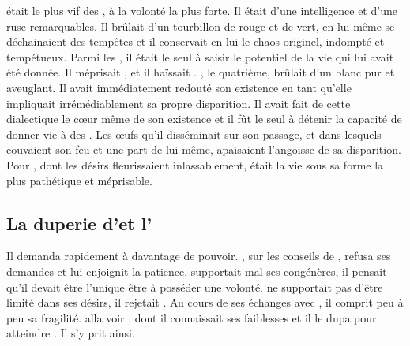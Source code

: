 \Ogo était le plus vif des \Dormus, à la volonté la plus forte. Il était d'une intelligence et d'une ruse remarquables. Il brûlait d'un tourbillon de rouge et de vert, en lui-même se déchainaient des tempêtes et il conservait en lui le chaos originel, indompté et tempétueux. Parmi les \Dormus, il était le seul à saisir le potentiel de la vie qui lui avait été donnée. Il méprisait \Boromu, et il haïssait \Tot. \Tot, le quatrième, brûlait d'un blanc pur et aveuglant. Il avait immédiatement redouté son existence en tant qu'elle impliquait irrémédiablement sa propre disparition. Il avait fait de cette dialectique le cœur même de son existence et il fût le seul à détenir la capacité de donner vie à des \SerpentsCosmiques. Les œufs qu'il disséminait sur son passage, et dans lesquels couvaient son feu et une part de lui-même, apaisaient l'angoisse de sa disparition. Pour \Ogo, dont les désirs fleurissaient inlassablement, \Tot
était la vie sous sa forme la plus pathétique et méprisable.

\subsection{La duperie d'\Ogo et l'\Extinction}


 Il demanda rapidement à \Mey davantage de pouvoir. \Mey, sur les conseils de \Cind, refusa ses demandes et lui enjoignit la patience. \Ogo supportait mal ses congénères, il pensait qu'il devait être l'unique être à posséder une volonté. \Ogo ne supportait pas d'être limité dans ses désirs, il rejetait \Mey. Au cours de ses échanges avec \Mey, il comprit peu à peu sa fragilité. \Ogo alla voir \Esu, dont il connaissait ses faiblesses et il le dupa pour atteindre \Mey. Il s'y prit ainsi.


